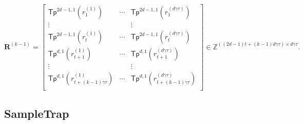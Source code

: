 \documentclass[runningheads]{llncs}
\begin{document}
       \begin{equation}\label{k35}
        \textbf{R}^{(k-1)}=\begin{bmatrix}
        \mathsf{Tp}^{2d-1,1}(r^{(1)}_{1})& \cdots& \mathsf{Tp}^{2d-1,1}(r^{(d\gamma \tau)}_{1})\\
        \vdots&&\vdots\\
        \mathsf{Tp}^{2d-1,1}(r^{(1)}_{t}) & \cdots& \mathsf{Tp}^{2d-1,1}(r^{(d\gamma \tau)}_{t})\\
        \mathsf{Tp}^{d,1}(r^{(1)}_{t+1})& \cdots& \mathsf{Tp}^{d,1}(r^{(d\gamma \tau)}_{t+1})\\
        \vdots&&\vdots\\
        \mathsf{Tp}^{d,1}(r^{(1)}_{t+(k-1)\gamma \tau})& \cdots& \mathsf{Tp}^{d,1}(r^{(d\gamma \tau)}_{t+(k-1)\gamma \tau})\\ 
        \end{bmatrix} \in \mathbb{Z}^{((2d-1)t+(k-1)d\gamma \tau) \times d\gamma \tau}.
        \end{equation}
          
          
          \fi
 
          
\subsection{\textsf{SampleTrap}} \label{multrap}
\end{document}
